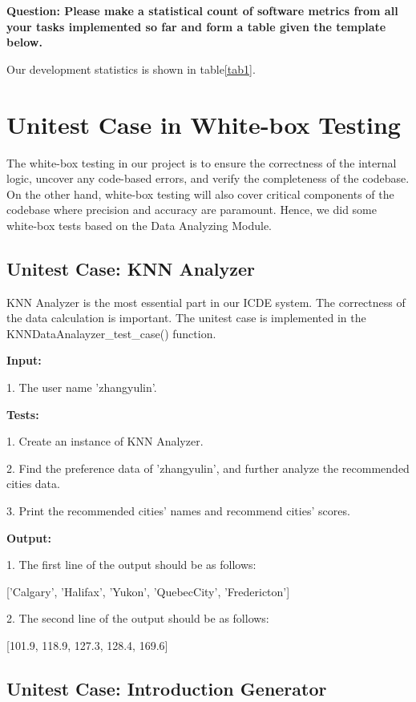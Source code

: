 \documentclass[conference]{IEEEtran}
\begin{document}
\textbf{Question: Please make a statistical count of software metrics from all your tasks implemented so far and
form a table given the template below. }

Our development statistics is shown in table\ref{tab1}. 


\section{ \textbf{ Unitest Case in White-box Testing}}

The white-box testing in our project is to ensure the correctness of the internal logic, uncover any code-based errors, and verify the completeness of the codebase. On the other hand, white-box testing will also cover critical components of the codebase where precision and accuracy are paramount. Hence, we did some white-box tests based on the Data Analyzing Module.


\subsection{ \textbf{ Unitest Case: KNN Analyzer }}

KNN Analyzer is the most essential part in our ICDE system. The correctness of the data calculation is important.
The unitest case is implemented in the KNNDataAnalayzer\_test\_case() function.

 \textbf{ Input: }

1. The user name 'zhangyulin'.


 \textbf{ Tests: }

1. Create an instance of KNN Analyzer.

2. Find the preference data of 'zhangyulin', and further analyze the recommended cities data.

3. Print the recommended cities' names and recommend cities' scores.

 \textbf{ Output: }

1. The first line of the output should be as follows:

['Calgary', 'Halifax', 'Yukon', 'QuebecCity', 'Fredericton']

2. The second line of the output should be as follows:

[101.9, 118.9, 127.3, 128.4, 169.6]



\subsection{ \textbf{ Unitest Case: Introduction Generator }}
\end{document}
